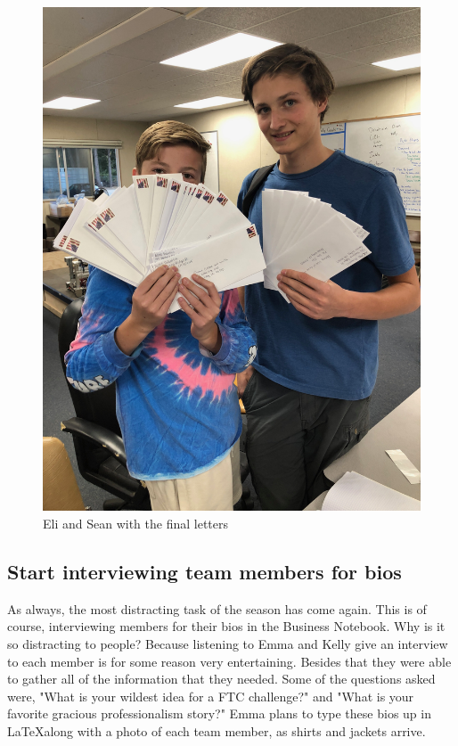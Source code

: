 \documentclass{article}
\begin{document}
\begin{figure}
    \centering
    \includegraphics[width=.6 \textwidth]{07_10-15/images/letters.jpg}
    \caption{Eli and Sean with the final letters}
    \label{fig:Letters}
\end{figure}

\subsection{Start interviewing team members for bios}
As always, the most distracting task of the season has come again. This is of course, interviewing members for their bios in the Business Notebook. Why is it so distracting to people? Because listening to Emma and Kelly give an interview to each member is for some reason very entertaining. Besides that they were able to gather all of the information that they needed. Some of the questions asked were, "What is your wildest idea for a FTC challenge?" and "What is your favorite gracious professionalism story?" Emma plans to type these bios up in \LaTeX along with a photo of each team member, as shirts and jackets arrive. 
\end{document}
